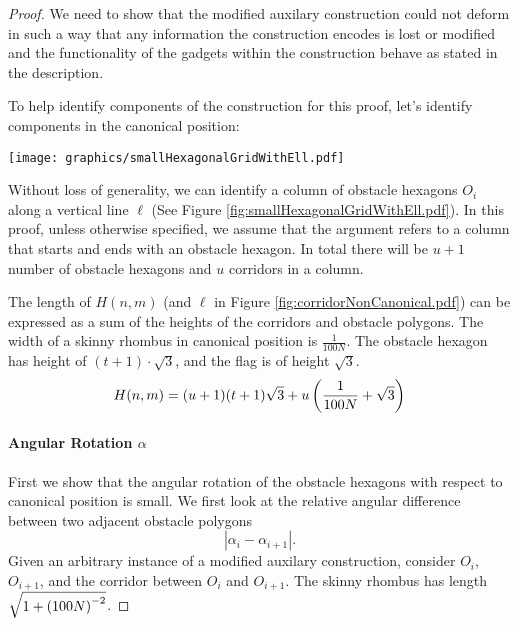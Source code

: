 \begin{proof}
We need to show that the modified auxilary construction could not deform in such a way that any information the construction encodes is lost or modified and the functionality of the gadgets within the construction behave as stated in the description.

To help identify components of the construction for this proof, let's identify components in the canonical position:

\begin{minipage}{\linewidth}
\begin{center}
\texttt{[image: graphics/smallHexagonalGridWithEll.pdf]}
\label{fig:smallHexagonalGridWithEll.pdf}
\end{center}
\end{minipage}

Without loss of generality, we can identify a column of obstacle hexagons $O_i$ along a vertical line $\ell$ (See Figure \ref{fig:smallHexagonalGridWithEll.pdf}).
In this proof, unless otherwise specified, we assume that the argument refers to a column that starts and ends with an obstacle hexagon.  
In total there will be $u+1$ number of obstacle hexagons and $u$ corridors in a column. 

The length of $H(n,m)$ (and $\ell$ in Figure \ref{fig:corridorNonCanonical.pdf}) can be expressed as a sum of the heights of the corridors and obstacle polygons.
The width of a skinny rhombus in canonical position is $\frac{1}{100N}$.
The obstacle hexagon has height of $ (t+1) \cdot \sqrt{3}$, and the flag is of height $\sqrt{3}$.  
\begin{equation}\label{eqn:Hnm}
H(n,m) = (u+1) (t+1) \sqrt{3} + u \left( \frac{1}{100N} + \sqrt{3} \right)
\end{equation}

\paragraph{Angular Rotation $\alpha$}
First we show that the angular rotation of the obstacle hexagons with respect to canonical position is small.  
We first look at the relative angular difference between two adjacent obstacle polygons
$$\left\vert \alpha_i - \alpha_{i+1} \right\vert.$$
Given an arbitrary instance of a modified auxilary construction, consider $O_i$, $O_{i+1}$, and the corridor between $O_i$ and $O_{i+1}$.
The skinny rhombus  has length $\sqrt{1 + \left( 100N \right)^{-2}}$.




\end{proof}

